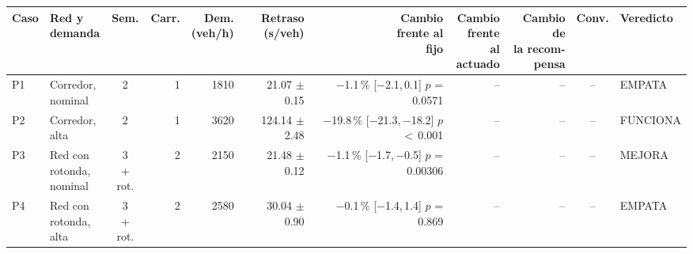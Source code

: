 \begin{table}[H]
\centering
\scriptsize
\setlength{\tabcolsep}{1.5pt}
\begin{tabular}{llcrrrrrrcl}
\toprule
Caso & \makecell[l]{Red y\\demanda} & Sem. & Carr. & \makecell{Dem.\\(veh/h)} & \makecell{Retraso\\(s/veh)} & \makecell{Cambio\\frente al\\fijo} & \makecell{Cambio\\frente al\\actuado} & \makecell{Cambio de\\la recom-\\pensa} & Conv. & Veredicto \\
\midrule
P1 & \makecell[l]{Corredor,\\{}nominal} & 2 & 1 & 1810 & \makecell[r]{21.07\\{}$\pm$ 0.15} & \makecell[r]{$-$1.1\,\%\\{}[$-$2.1,\,0.1]\\$p$ = 0.0571} & -- & -- & -- & EMPATA \\
P2 & \makecell[l]{Corredor,\\{}alta} & 2 & 1 & 3620 & \makecell[r]{124.14\\{}$\pm$ 2.48} & \makecell[r]{$-$19.8\,\%\\{}[$-$21.3,\,$-$18.2]\\$p$ $<$\,0.001} & -- & -- & -- & FUNCIONA \\
P3 & \makecell[l]{Red con\\{}rotonda,\\{}nominal} & \makecell[c]{3\\{}+ rot.} & 2 & 2150 & \makecell[r]{21.48\\{}$\pm$ 0.12} & \makecell[r]{$-$1.1\,\%\\{}[$-$1.7,\,$-$0.5]\\$p$ = 0.00306} & -- & -- & -- & MEJORA \\
P4 & \makecell[l]{Red con\\{}rotonda,\\{}alta} & \makecell[c]{3\\{}+ rot.} & 2 & 2580 & \makecell[r]{30.04\\{}$\pm$ 0.90} & \makecell[r]{$-$0.1\,\%\\{}[$-$1.4,\,1.4]\\$p$ = 0.869} & -- & -- & -- & EMPATA \\

\end{tabular}
\end{table}
